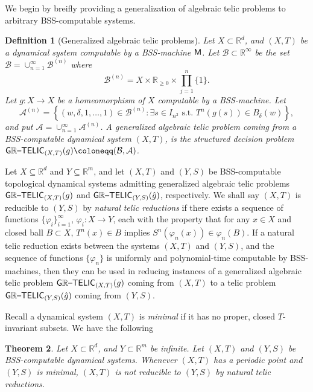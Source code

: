 \documentclass{amsart}
\theoremstyle{theorem}
\newtheorem{theorem}{Theorem}[section]
\newtheorem{definition}[theorem]{Definition}
\theoremstyle{remark}
\newcommand{\RR}{\mathbb{R}}
\newcommand{\ccM}{\textsf{\upshape M}}
\newcommand{\ccGRTELIC}{\textsf{\upshape G}\mathbb{R}\textsf{\upshape --TELIC}}
\newcommand{\cA}{\mathcal{A}}
\newcommand{\cB}{\mathcal{B}}
\begin{document}
We begin by breifly providing a generalization of algebraic telic problems to arbitrary BSS-computable systems.

\begin{definition}[Generalized algebraic telic problems]\label{defGenRtelic}
Let $X \subset \RR^d$, and $(X, T)$ be a dynamical system computable by a BSS-machine $\ccM$. Let $\cB\subset \RR^\infty$ be the set $\cB = \cup_{n=1}^\infty \cB^{(n)}$ where 
\[
\cB^{(n)} = X \times \RR_{\geq 0} \times \prod_{j=1}^n \{1\}.
\]
Let $g:X \rightarrow X$ be a homeomorphism of $X$ computable by a BSS-machine.
Let
\[
\cA^{(n)} = \left\{(w, \delta, 1,\dots,1) \in \cB^{(n)} : \exists s \in I_{n^2} \text{ s.t. } T^n(g(s)) \in B_\delta(w)\right\},
\]
and put $\cA = \cup_{n=1}^\infty \cA^{(n)}$.
A \emph{generalized algebraic telic problem} coming from a BSS-computable dynamical system $(X, T)$, is the structured decision problem $\ccGRTELIC_{(X, T)}(g) \coloneqq (\cB, \cA)$.
\end{definition}

Let $X \subseteq \RR^d$ and $Y \subseteq \RR^m$, and let $(X,T)$ and $(Y, S)$ be BSS-computable topological dynamical systems admitting generalized algebraic telic problems $\ccGRTELIC_{(X, T)}(g)$ and $\ccGRTELIC_{(Y, S)}(\hat{g})$, respectively.
We shall say $(X, T)$ is reducible to $(Y, S)$ by \emph{natural telic reductions} if there exists a sequence of functions $\{\varphi_i\}_{i=1}^\infty$, $\varphi_i:X\rightarrow Y$, each with the property that for any $x \in X$ and closed ball $B \subset X$, $T^{n}(x) \in B$ implies $S^{n}(\varphi_n(x)) \in \varphi_n(B)$.
If a natural telic reduction exists between the systems $(X, T)$ and $(Y, S)$, and the sequence of functions $\{\varphi_n\}$ is uniformly and polynomial-time computable by BSS-machines, then they can be used in reducing instances of a generalized algebraic telic problem $\ccGRTELIC_{(X, T)}(g)$ coming from $(X, T)$ to a telic problem $\ccGRTELIC_{(Y, S)}(\hat{g})$ coming from $(Y, S)$.

Recall a dynamical system $(X, T)$ is \emph{minimal} if it has no proper, closed $T$-invariant subsets.
We have the following

\begin{theorem}\label{thmImpossibleRed}
Let $X \subset \RR^d$, and $Y\subset \RR^m$ be infinite. Let $(X, T)$ and $(Y, S)$ be BSS-computable dynamical systems. Whenever $(X, T)$ has a periodic point and $(Y, S)$ is minimal, $(X, T)$ is not reducible to $(Y, S)$ by natural telic reductions.
\end{theorem}
\end{document}
